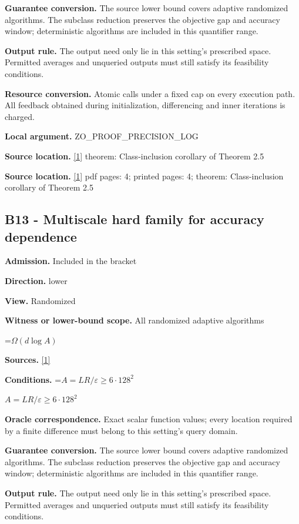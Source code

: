 \documentclass[10pt,a4paper]{article}
\newcommand{\AtlasMath}[1]{\par\begingroup\centering\setbox0=\hbox{$\displaystyle #1$}\ifdim\wd0>1.4\linewidth\typeout{ATLAS WIDE FORMULA: \the\wd0}\fi\ifdim\wd0>\linewidth\resizebox{\linewidth}{!}{\box0}\else\box0\fi\par\endgroup}
\newcommand{\AtlasInlineMath}[1]{\begingroup\setbox0=\hbox{$#1$}\ifdim\wd0>.4\linewidth\endgroup\AtlasMath{#1}\else\endgroup$#1$\fi}
\begin{document}
\textbf{Guarantee conversion.} The source lower bound covers adaptive randomized algorithms. The subclass reduction preserves the objective gap and accuracy window; deterministic algorithms are included in this quantifier range.

\textbf{Output rule.} The output need only lie in this setting's prescribed space. Permitted averages and unqueried outputs must still satisfy its feasibility conditions.

\textbf{Resource conversion.} Atomic calls under a fixed cap on every execution path. All feedback obtained during initialization, differencing and inner iterations is charged.

\textbf{Local argument.} ZO\_\allowbreak{}PROOF\_\allowbreak{}PRECISION\_\allowbreak{}LOG

\textbf{Source location.} \href{https://arxiv.org/html/2610.00345v1}{[1]} theorem: Class-inclusion corollary of Theorem 2.5

\textbf{Source location.} \href{https://arxiv.org/html/2610.00345v1}{[1]} pdf pages: 4; printed pages: 4; theorem: Class-inclusion corollary of Theorem 2.5

\subsection{B13 - Multiscale hard family for accuracy dependence}
\textbf{Admission.} Included in the bracket

\textbf{Direction.} lower

\textbf{View.} Randomized

\textbf{Witness or lower-bound scope.} All randomized adaptive algorithms

\AtlasMath{\Omega(d\log A)}
\textbf{Sources.} \href{https://arxiv.org/html/2610.00345v1}{[1]}

\textbf{Conditions.} \AtlasInlineMath{A=LR/\varepsilon\ge6\cdot128^2}

\textbf{Oracle correspondence.} Exact scalar function values; every location required by a finite difference must belong to this setting's query domain.

\textbf{Guarantee conversion.} The source lower bound covers adaptive randomized algorithms. The subclass reduction preserves the objective gap and accuracy window; deterministic algorithms are included in this quantifier range.

\textbf{Output rule.} The output need only lie in this setting's prescribed space. Permitted averages and unqueried outputs must still satisfy its feasibility conditions.
\end{document}
